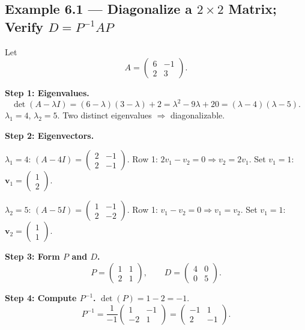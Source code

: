 \documentclass[12pt,a4paper]{article}
\begin{document}
\subsection*{Example 6.1 --- Diagonalize a $2\times 2$ Matrix; Verify $D = P^{-1}AP$}

Let
\[
  A = \begin{pmatrix} 6 & -1 \\ 2 & 3 \end{pmatrix}.
\]

\textbf{Step 1: Eigenvalues.}
\[
  \det(A-\lambda I) = (6-\lambda)(3-\lambda)+2 = \lambda^2 - 9\lambda + 20 = (\lambda-4)(\lambda-5).
\]
$\lambda_1 = 4$, $\lambda_2 = 5$. Two distinct eigenvalues $\Rightarrow$ diagonalizable.

\textbf{Step 2: Eigenvectors.}

$\lambda_1=4$: $(A-4I) = \begin{pmatrix}2&-1\\2&-1\end{pmatrix}$. Row 1: $2v_1-v_2=0 \Rightarrow v_2=2v_1$. Set $v_1=1$: $\mathbf{v}_1=\begin{pmatrix}1\\2\end{pmatrix}$.

$\lambda_2=5$: $(A-5I) = \begin{pmatrix}1&-1\\2&-2\end{pmatrix}$. Row 1: $v_1-v_2=0 \Rightarrow v_1=v_2$. Set $v_1=1$: $\mathbf{v}_2=\begin{pmatrix}1\\1\end{pmatrix}$.

\textbf{Step 3: Form $P$ and $D$.}
\[
  P = \begin{pmatrix}1&1\\2&1\end{pmatrix}, \qquad D = \begin{pmatrix}4&0\\0&5\end{pmatrix}.
\]

\textbf{Step 4: Compute $P^{-1}$.}
$\det(P) = 1-2 = -1$.
\[
  P^{-1} = \frac{1}{-1}\begin{pmatrix}1&-1\\-2&1\end{pmatrix} = \begin{pmatrix}-1&1\\2&-1\end{pmatrix}.
\]
\end{document}
